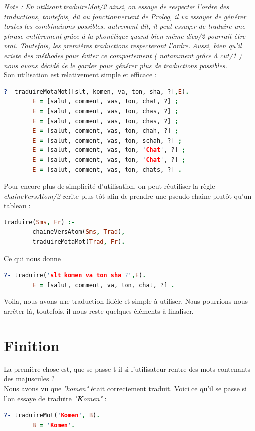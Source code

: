 \documentclass[11pt]{report}
\begin{document}
	{\em Note : En utilisant traduireMot/2 ainsi, on essaye de respecter l'ordre des traductions, toutefois, dû au fonctionnement de Prolog, il va essayer de générer toutes les combinaisons possibles, autrement dit, il peut essayer de traduire une phrase entièrement grâce à la phonétique quand bien même dico/2 pourrait être vrai. Toutefois, les premières traductions respecteront l'ordre. Aussi, bien qu'il existe des méthodes pour éviter ce comportement ( notamment grâce à cut/1 ) nous avons décidé de le garder pour générer plus de traductions possibles.}\\
	
	Son utilisation est relativement simple et efficace :
	\begin{lstlisting}[language=Prolog]
	?- traduireMotaMot([slt, komen, va, ton, sha, ?],E).
		E = [salut, comment, vas, ton, chat, ?] ;
		E = [salut, comment, vas, ton, chas, ?] ;
		E = [salut, comment, vas, ton, chas, ?] ;
		E = [salut, comment, vas, ton, chah, ?] ;
		E = [salut, comment, vas, ton, schah, ?] ;
		E = [salut, comment, vas, ton, 'Chat', ?] ;
		E = [salut, comment, vas, ton, 'Chat', ?] ;
		E = [salut, comment, vas, ton, chats, ?] .
	\end{lstlisting}
	
	Pour encore plus de simplicité d'utilisation, on peut réutiliser la règle {\em chaineVersAtom/2} écrite plus tôt afin de prendre une pseudo-chaine plutôt qu'un tableau :
	\begin{lstlisting}[language=Prolog]
	traduire(Sms, Fr) :-
		chaineVersAtom(Sms, Trad),
		traduireMotaMot(Trad, Fr).
	\end{lstlisting}
	
	Ce qui nous donne :
	\begin{lstlisting}[language=Prolog]
	?- traduire('slt komen va ton sha ?',E).
		E = [salut, comment, va, ton, chat, ?] .
	\end{lstlisting}
	
	Voila, nous avons une traduction fidèle et simple à utiliser. Nous pourrions nous arrêter là, toutefois, il nous reste quelques éléments à finaliser. 
	
	\section{Finition}
	La première chose est, que se passe-t-il si l'utilisateur rentre des mots contenants des majuscules ?\\
	Nous avons vu que {\em "komen"} était correctement traduit. Voici ce qu'il se passe si l'on essaye de traduire {\em "\textbf{K}omen"} :
	\begin{lstlisting}[language=Prolog]
	?- traduireMot('Komen', B).
		B = 'Komen'.
	\end{lstlisting}
	
\end{document}
